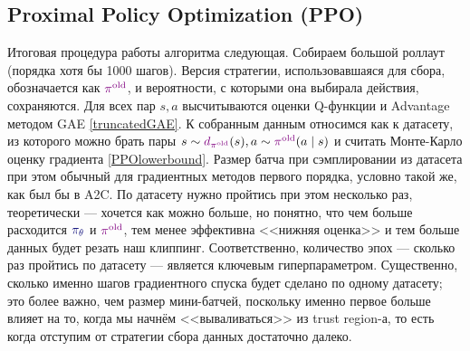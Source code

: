 \subsection{Proximal Policy Optimization (PPO)}

Итоговая процедура работы алгоритма следующая. Собираем большой роллаут (порядка хотя бы 1000 шагов). Версия стратегии, использовавшаяся для сбора, обозначается как $\textcolor{ChadPurple}{\pi^{\old}}$, и вероятности, с которыми она выбирала действия, сохраняются. Для всех пар $s, a$ высчитываются оценки Q-функции и Advantage методом GAE \eqref{truncatedGAE}. К собранным данным относимся как к датасету, из которого можно брать пары $s \HM\sim \textcolor{ChadPurple}{d_{\pi^{\old}}}(s), a \HM\sim \textcolor{ChadPurple}{\pi^{\old}}(a \mid s)$ и считать Монте-Карло оценку градиента \eqref{PPOlowerbound}. Размер батча при сэмплировании из датасета при этом обычный для градиентных методов первого порядка, условно такой же, как был бы в A2C. По датасету нужно пройтись при этом несколько раз, теоретически --- хочется как можно больше, но понятно, что чем больше расходится $\textcolor{ChadBlue}{\pi_\theta}$ и $\textcolor{ChadPurple}{\pi^{\old}}$, тем менее эффективна <<нижняя оценка>> и тем больше данных будет резать наш клиппинг. Соответственно, количество эпох --- сколько раз пройтись по датасету --- является ключевым гиперпараметром. Существенно, сколько именно шагов градиентного спуска будет сделано по одному датасету; это более важно, чем размер мини-батчей, поскольку именно первое больше влияет на то, когда мы начнём <<вываливаться>> из trust region-а, то есть когда отступим от стратегии сбора данных достаточно далеко.


